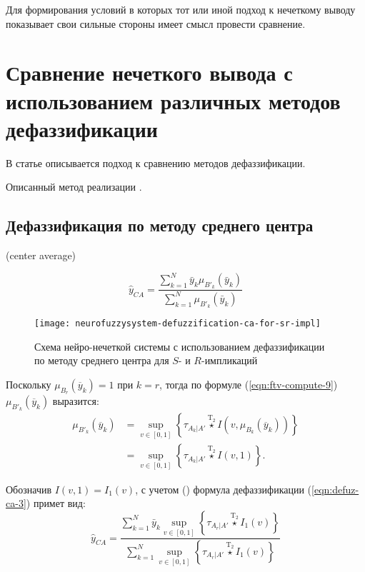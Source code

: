 Для формирования условий  в которых тот или иной подход к нечеткому выводу показывает  свои сильные стороны имеет смысл провести сравнение.

\section{Сравнение нечеткого вывода с использованием различных методов дефаззификации}

В статье \cite{VanLeekwijck1999} описывается подход к сравнению методов дефаззификации.

Описанный метод реализации \cite{eisele1994}.

\subsection{Дефаззификация по методу среднего центра}

(center average)

\begin{equation*}
	\label{eqn:defuz-ca-1}
	\hat{y}_{CA} = \frac{\sum_{k=1}^{N} \bar{y}_k \mu_{B'_k}(\bar{y}_k)}{\sum_{k=1}^{N} \mu_{B'_k}(\bar{y}_k)}
\end{equation*}

\begin{figure}[ht]
	\centering
	\texttt{[image: neurofuzzysystem-defuzzification-ca-for-sr-impl]}
	\caption{Схема нейро-нечеткой системы с использованием дефаззификации по методу среднего центра для $S$- и $R$-импликаций}
	\label{fig:neurofuzzysystem-defuzzification-ca-for-sr-impl}
\end{figure}

Поскольку $\mu_{B_r}(\overline{y}_k) = 1$ при $k = r$, тогда по формуле (\ref{eqn:ftv-compute-9}) $\mu_{B'_k}(\overline{y}_k)$ выразится:
\begin{align}
	\label{eqn:defuz-ca-3}
	\mu_{B'_k}(\overline{y}_k) &= \sup_{v\in [0, 1]} \left\{\tau_{A_k|A'}\overset{\mathrm{T}_2}{\star} I\left(v, \mu_{B_k}(\overline{y}_k)\right)\right\}\\ &= \sup_{v\in [0, 1]} \left\{\tau_{A_k|A'}\overset{\mathrm{T}_2}{\star} I\left(v, 1\right)\right\}.
\end{align}

Обозначив $I(v, 1) = I_1(v)$, с учетом () формула дефаззификации (\ref{eqn:defuz-ca-3}) примет вид:
\begin{equation}
	\label{eqn:defuz-ca-4}
	\hat{y}_{CA} = \frac{\sum_{k=1}^{N} \bar{y}_k \sup_{v\in [0, 1]} \left\{\tau_{A_r|A'}\overset{\mathrm{T}_2}{\star} I_1(v) \right\}}{\sum_{k=1}^{N} \sup_{v\in [0, 1]} \left\{\tau_{A_r|A'}\overset{\mathrm{T}_2}{\star} I_1(v) \right\}}
\end{equation}

